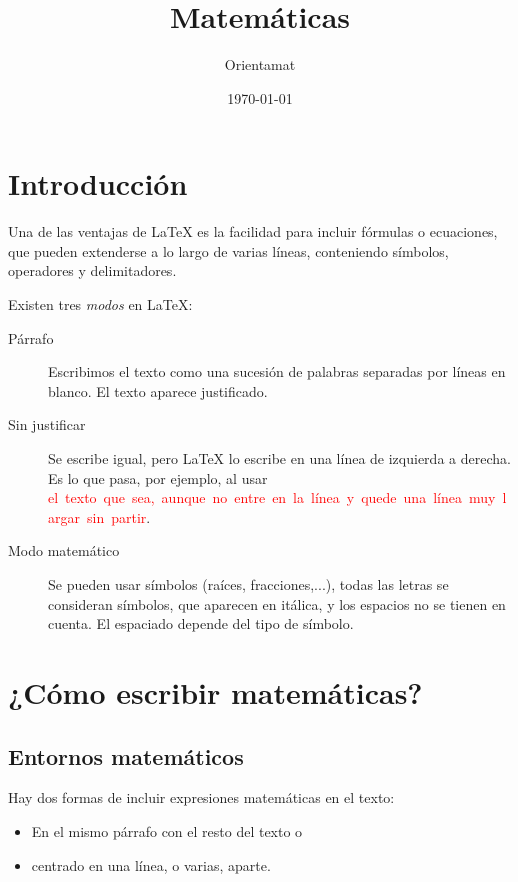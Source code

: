 \documentclass{article}
\title{Matemáticas} %
\author{Orientamat} %
\date{\today} %
\numberwithin{equation}{section}
\theoremstyle{plain}
\theoremstyle{definition}
\theoremstyle{remark}
\begin{document}
\maketitle

\tableofcontents

\bigskip

\section{Introducción}

Una de las ventajas de \LaTeX{} es la facilidad para incluir fórmulas o ecuaciones, que pueden extenderse a lo largo de varias líneas, conteniendo símbolos, operadores y delimitadores.

Existen tres \emph{modos} en \LaTeX:
\begin{description}
    \item[Párrafo] Escribimos el texto como una sucesión de palabras separadas por líneas en blanco. El texto aparece justificado.
    \item[Sin justificar] Se escribe igual, pero \LaTeX{} lo escribe en una línea de izquierda a derecha. Es lo que pasa, por ejemplo, al usar \mbox{\textcolor{red}{el texto que sea, aunque no entre en la línea y quede una línea muy largar sin partir}}.
    \item[Modo matemático] Se pueden usar símbolos (raíces, fracciones,...), todas las letras se consideran símbolos, que aparecen en itálica, y los espacios no se tienen en cuenta. El espaciado depende del tipo de símbolo.
\end{description}

\section{¿Cómo escribir matemáticas?}

\subsection{Entornos matemáticos}


Hay dos formas de incluir expresiones matemáticas en el texto:
\begin{itemize}
    \item En el mismo párrafo con el resto del texto o
    \item centrado en una línea, o varias, aparte.
\end{itemize}
\end{document}
